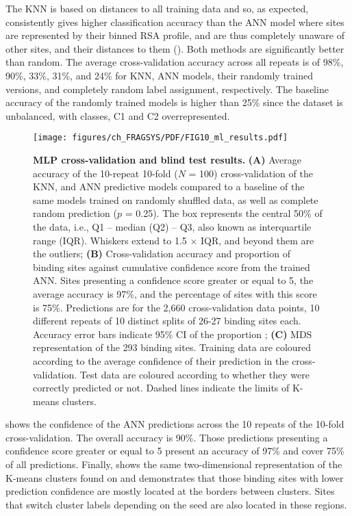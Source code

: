 The KNN is based on distances to all training data and so, as expected, consistently gives higher classification accuracy than the ANN model where sites are represented by their binned RSA profile, and are thus completely unaware of other sites, and their distances to them (). Both methods are significantly better than random. The average cross-validation accuracy across all repeats is of 98\%, 90\%, 33\%, 31\%, and 24\% for KNN, ANN models, their randomly trained versions, and completely random label assignment, respectively. The baseline accuracy of the randomly trained models is higher than 25\% since the dataset is unbalanced, with classes, C1 and C2 overrepresented.

\begin{figure}[ht!]
    \centering
    \texttt{[image: figures/ch\_FRAGSYS/PDF/FIG10\_ml\_results.pdf]}
    \caption[MLP cross-validation and blind test results]{\textbf{MLP cross-validation and blind test results.} \textbf{(A)} Average accuracy of the 10-repeat 10-fold ($N$ = 100) cross-validation of the KNN, and ANN predictive models compared to a baseline of the same models trained on randomly shuffled data, as well as complete random prediction ($p$ = 0.25). The box represents the central 50\% of the data, i.e., Q1 – median (Q2) – Q3, also known as interquartile range (IQR). Whiskers extend to 1.5 $\times$ IQR, and beyond them are the outliers; \textbf{(B)} Cross-validation accuracy and proportion of binding sites against cumulative confidence score from the trained ANN. Sites presenting a confidence score greater or equal to 5, the average accuracy is 97\%, and the percentage of sites with this score is 75\%. Predictions are for the 2,660 cross-validation data points, 10 different repeats of 10 distinct splits of 26-27 binding sites each. Accuracy error bars indicate 95\% CI of the proportion \cite{WILSON_197_PROP_CI}; \textbf{(C)} MDS representation of the 293 binding sites. Training data are coloured according to the average confidence of their prediction in the cross-validation. Test data are coloured according to whether they were correctly predicted or not. Dashed lines indicate the limits of K-means clusters.}
    \label{fig:MLP_CV_blind_test}
\end{figure}

 shows the confidence of the ANN predictions across the 10 repeats of the 10-fold cross-validation. The overall accuracy is 90\%. Those predictions presenting a confidence score greater or equal to 5 present an accuracy of 97\% and cover 75\% of all predictions. Finally,  shows the same two-dimensional representation of the K-means clusters found on  and demonstrates that those binding sites with lower prediction confidence are mostly located at the borders between clusters. Sites that switch cluster labels depending on the seed are also located in these regions.


